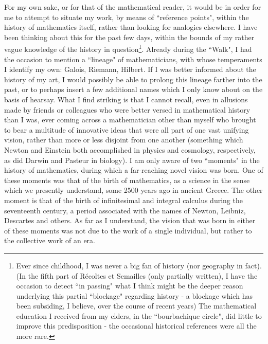 For my own sake, or for that of the mathematical reader, it would be in order for me to attempt to situate my work, by means of ``reference points", within the history of mathematics itself, rather than looking for analogies elsewhere. I have been thinking about this for the past few days, within the bounds of my rather vague knowledge of the history in question\footnote{Ever since childhood, I was never a big fan of history (nor geography in fact). (In the fifth part of R\'ecoltes et Semailles (only partially written), I have the occasion to detect ``in passing" what I think might be the deeper reason underlying this partial ``blockage" regarding history - a blockage which has been subsiding, I believe, over the course of recent years) The mathematical education I received from my elders, in the ``bourbachique circle", did little to improve this predisposition - the occasional historical references were all the more rare.}. Already during the ``Walk", I had the occasion to mention a ``lineage" of mathematicians, with whose temperaments I identify my own: Galois, Riemann, Hilbert. If I was better informed about the history of my art, I would possibly be able to prolong this lineage farther into the past, or to perhaps insert a few additional names which I only know about on the basis of hearsay. What I find striking is that I cannot recall, even in allusions made by friends or colleagues who were better versed in mathematical history than I was, ever coming across a mathematician other than myself who brought to bear a multitude of innovative ideas that were all part of one vast unifying vision, rather than more or less disjoint from one another (something which Newton and Einstein both accomplished in physics and cosmology, respectively, as did Darwin and Pasteur in biology). I am only aware of two ``moments" in the history of mathematics, during which a far-reaching novel vision was born. One of these moments was that of the birth of mathematics, as a science in the sense which we presently understand, some 2500 years ago in ancient Greece. The other moment is that of the birth of infinitesimal and integral calculus during the seventeenth century, a period associated with the names of Newton, Leibniz, Descartes and others. As far as I understand, the vision that was born in either of these moments was not due to the work of a single individual, but rather to the collective work of an era. 

